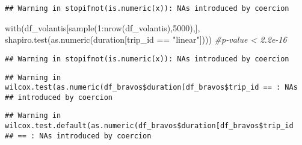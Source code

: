 \documentclass[
]{article}
\newenvironment{Shaded}{\begin{snugshade}}{\end{snugshade}}
\newcommand{\AttributeTok}[1]{\textcolor[rgb]{0.77,0.63,0.00}{#1}}
\newcommand{\CommentTok}[1]{\textcolor[rgb]{0.56,0.35,0.01}{\textit{#1}}}
\newcommand{\DecValTok}[1]{\textcolor[rgb]{0.00,0.00,0.81}{#1}}
\newcommand{\FunctionTok}[1]{\textcolor[rgb]{0.00,0.00,0.00}{#1}}
\newcommand{\NormalTok}[1]{#1}
\newcommand{\SpecialCharTok}[1]{\textcolor[rgb]{0.00,0.00,0.00}{#1}}
\newcommand{\StringTok}[1]{\textcolor[rgb]{0.31,0.60,0.02}{#1}}
\begin{document}
\begin{verbatim}
## Warning in stopifnot(is.numeric(x)): NAs introduced by coercion
\end{verbatim}

\begin{Shaded}
\begin{Highlighting}[]
\FunctionTok{with}\NormalTok{(df\_volantis[}\FunctionTok{sample}\NormalTok{(}\DecValTok{1}\SpecialCharTok{:}\FunctionTok{nrow}\NormalTok{(df\_volantis),}\DecValTok{5000}\NormalTok{),], }
     \FunctionTok{shapiro.test}\NormalTok{(}\FunctionTok{as.numeric}\NormalTok{(duration[trip\_id }\SpecialCharTok{==} \StringTok{"linear"}\NormalTok{]))) }\CommentTok{\#p{-}value \textless{} 2.2e{-}16}
\end{Highlighting}
\end{Shaded}

\begin{verbatim}
## Warning in stopifnot(is.numeric(x)): NAs introduced by coercion
\end{verbatim}

\begin{Shaded}
\end{Shaded}

\begin{verbatim}
## Warning in wilcox.test(as.numeric(df_bravos$duration[df_bravos$trip_id == : NAs
## introduced by coercion
\end{verbatim}

\begin{verbatim}
## Warning in wilcox.test.default(as.numeric(df_bravos$duration[df_bravos$trip_id
## == : NAs introduced by coercion
\end{verbatim}

\begin{Shaded}
\end{Shaded}
\end{document}
